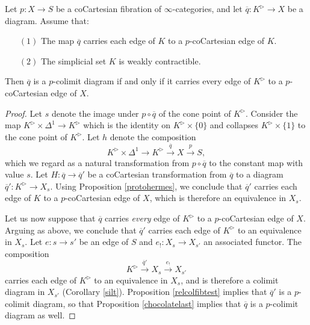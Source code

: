\begin{proposition}\label{timal}
Let $p: X \rightarrow S$ be a coCartesian fibration of $\infty$-categories, and let
$\overline{q}: K^{\triangleright} \rightarrow X$ be a diagram. Assume that:
\begin{itemize}
\item[$(1)$] The map $\overline{q}$ carries each edge of $K$ to a $p$-coCartesian
edge of $K$.
\item[$(2)$] The simplicial set $K$ is weakly contractible.
\end{itemize}

Then $\overline{q}$ is a $p$-colimit diagram if and only if 
it carries every edge of $K^{\triangleright}$ to a $p$-coCartesian edge of $X$.
\end{proposition}

\begin{proof}
Let $s$ denote the image under $p \circ \overline{q}$ of the cone point of $K^{\triangleright}$.
Consider the map $K^{\triangleright} \times \Delta^1 \rightarrow K^{\triangleright}$
which is the identity on $K^{\triangleright} \times \{0\}$ and collapses $K^{\triangleright} \times \{1\}$ to the cone point of $K^{\triangleright}$. Let $h$ denote the composition
$$ K^{\triangleright} \times \Delta^1 \rightarrow K^{\triangleright}
\stackrel{\overline{q}}{\rightarrow} X \stackrel{p}{\rightarrow} S,$$
which we regard as a natural transformation from $p \circ \overline{q}$ to the constant
map with value $s$. Let $H: \overline{q} \rightarrow \overline{q}'$ be a coCartesian transformation
from $\overline{q}$ to a diagram $\overline{q}': K^{\triangleright} \rightarrow X_{s}$.
Using Proposition \ref{protohermes}, we conclude that $\overline{q}'$ carries each
edge of $K$ to a $p$-coCartesian edge of $X$, which is therefore an equivalence
in $X_{s}$. 

Let us now suppose that $\overline{q}$ carries {\em every} edge of
$K^{\triangleright}$ to a $p$-coCartesian edge of $X$. Arguing as above, we conclude
that $\overline{q}'$ carries each edge of $K^{\triangleright}$ to an equivalence in $X_{s}$.
Let $e: s \rightarrow s'$ be an edge of $S$ and $e_{!}: X_{s} \rightarrow X_{s'}$ an associated functor. The composition
$$ K^{\triangleright} \stackrel{\overline{q}'}{\rightarrow} X_{s} \stackrel{e_{!}}{\rightarrow}
X_{s'}$$
carries each edge of $K^{\triangleright}$ to an equivalence in $X_{s}$, and 
is therefore a colimit diagram in $X_{s'}$ (Corollary \ref{silt}). Proposition \ref{relcolfibtest} implies
that $\overline{q}'$ is a $p$-colimit diagram, so that Proposition \ref{chocolatelast} implies that $\overline{q}$ is a $p$-colimit diagram as well.


\end{proof}
